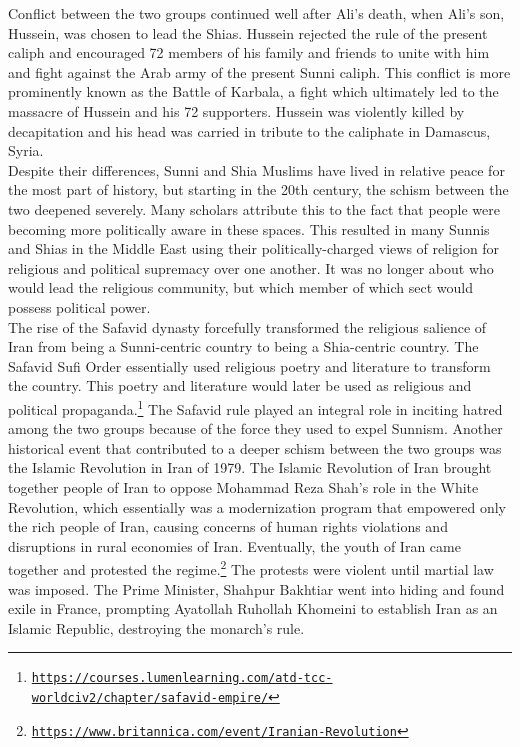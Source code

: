 \documentclass[10pt, letterpaper]{article}
\begin{document}
Conflict between the two groups continued well after Ali's death, when
Ali's son, Hussein, was chosen to lead the Shias. Hussein rejected the
rule of the present caliph and encouraged 72 members of his family and
friends to unite with him and fight against the Arab army of the present
Sunni caliph. This conflict is more prominently known as the Battle of
Karbala, a fight which ultimately led to the massacre of Hussein and his
72 supporters. Hussein was violently killed by decapitation and his head
was carried in tribute to the caliphate in Damascus, Syria. \\

Despite their differences, Sunni and Shia Muslims have lived in relative
peace for the most part of history, but starting in the 20th century,
the schism between the two deepened severely. Many scholars attribute
this to the fact that people were becoming more politically aware in
these spaces. This resulted in many Sunnis and Shias in the Middle East
using their politically-charged views of religion for religious and
political supremacy over one another. It was no longer about who would
lead the religious community, but which member of which sect would
possess political power. \\

The rise of the Safavid dynasty forcefully transformed the religious
salience of Iran from being a Sunni-centric country to being a
Shia-centric country. The Safavid Sufi Order essentially used religious
poetry and literature to transform the country. This poetry and
literature would later be used as religious and political
propaganda.\footnote{\texttt{\href{https://courses.lumenlearning.com/atd-tcc-worldciv2/chapter/safavid-empire/}{{https://courses.lumenlearning.com/atd-tcc-worldciv2/chapter/safavid-empire/}}}}
The Safavid rule played an integral role in inciting hatred among the
two groups because of the force they used to expel Sunnism. Another
historical event that contributed to a deeper schism between the two
groups was the Islamic Revolution in Iran of 1979. The Islamic
Revolution of Iran brought together people of Iran to oppose Mohammad
Reza Shah's role in the White Revolution, which essentially was a
modernization program that empowered only the rich people of Iran,
causing concerns of human rights violations and disruptions in rural
economies of Iran. Eventually, the youth of Iran came together and
protested the regime.\footnote{\texttt{\href{https://www.britannica.com/event/Iranian-Revolution}{{https://www.britannica.com/event/Iranian-Revolution}}}}
The protests were violent until martial law was imposed. The Prime
Minister, Shahpur Bakhtiar went into hiding and found exile in France,
prompting Ayatollah Ruhollah Khomeini to establish Iran as an Islamic
Republic, destroying the monarch's rule. \\
\end{document}
